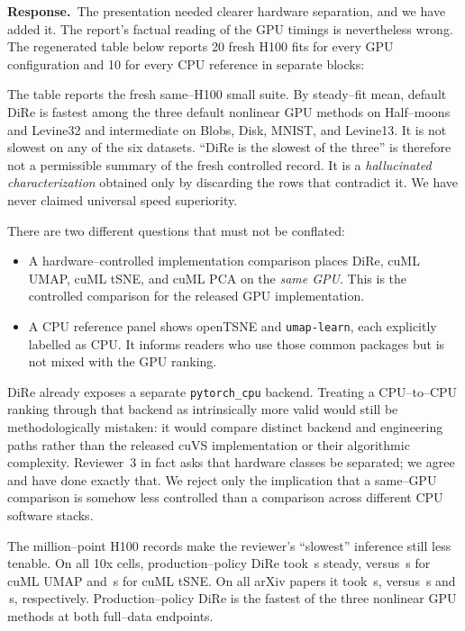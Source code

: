 \documentclass[11pt]{article}
\newcommand{\response}{%
  \noindent\textcolor{responseblue}{\textbf{Response.}}\ }
\begin{document}
\response The presentation needed clearer hardware separation, and we have
added it. The report's factual reading of the GPU timings is nevertheless
wrong. The regenerated table below reports 20 fresh H100 fits for every GPU
configuration and 10 for every CPU reference in separate blocks:

\begin{center}
\resizebox{\textwidth}{!}{%
  }
\end{center}

The table reports the fresh same--H100 small suite. By steady--fit mean,
default DiRe is fastest among the three default nonlinear GPU methods on
Half--moons and Levine32 and intermediate on Blobs, Disk, MNIST, and
Levine13. It is not slowest on any of the six datasets. ``DiRe is the slowest
of the three'' is therefore not a permissible summary of the fresh controlled
record. It is a
\emph{hallucinated characterization} obtained only by discarding the rows that
contradict it. We have never claimed universal speed superiority.

There are two different questions that must not be conflated:

\begin{itemize}
  \item A hardware--controlled implementation comparison places DiRe, cuML
  UMAP, cuML tSNE, and cuML PCA on the \emph{same GPU}. This is the controlled
  comparison for the released GPU implementation.
  \item A CPU reference panel shows openTSNE and
  \texttt{umap-learn}, each explicitly labelled as CPU. It informs readers who
  use those common packages but is not mixed with the GPU ranking.
\end{itemize}

DiRe already exposes a separate \texttt{pytorch\_cpu} backend. Treating a
CPU--to--CPU ranking through that backend as intrinsically more valid would
still be methodologically mistaken: it would compare distinct backend and
engineering paths rather than the released cuVS implementation or their
algorithmic complexity. Reviewer~3 in fact asks that hardware classes be
separated; we agree and have done exactly that. We reject only the implication
that a same--GPU comparison is somehow less controlled than a comparison across
different CPU software stacks.

The million--point H100 records make the reviewer's ``slowest'' inference still
less tenable. On all \TenxN{} 10x cells, production--policy DiRe took
\TenxDireAutoSteadySeconds{}\,s steady, versus
\TenxCumlUmapSteadySeconds{}\,s for cuML UMAP and
\TenxCumlTsneSteadySeconds{}\,s for cuML tSNE. On all \ArxivN{} arXiv papers it
took \ArxivDireAutoSteadySeconds{}\,s, versus
\ArxivCumlUmapSteadySeconds{}\,s and
\ArxivCumlTsneSteadySeconds{}\,s, respectively. Production--policy DiRe is the
fastest of the three nonlinear GPU methods at both full--data endpoints.
\end{document}
